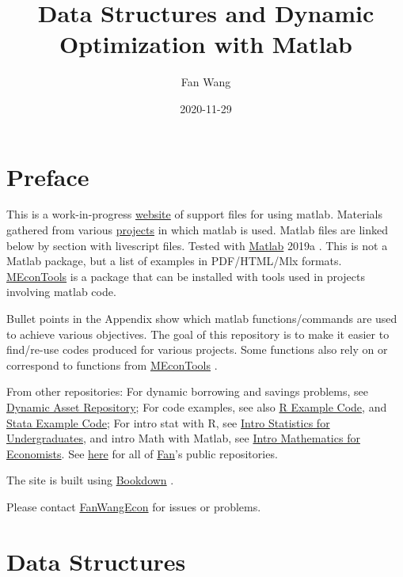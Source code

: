 \documentclass[
]{book}
\title{Data Structures and Dynamic Optimization with Matlab}
\author{Fan Wang}
\date{2020-11-29}
\begin{document}
\maketitle

{
\hypersetup{linkcolor=}
\setcounter{tocdepth}{2}
\tableofcontents
}
\hypertarget{preface}{%
\chapter*{Preface}\label{preface}}

This is a work-in-progress \href{https://fanwangecon.github.io/M4Econ/}{website} of support files for using matlab. Materials gathered from various \href{https://fanwangecon.github.io/research}{projects} in which matlab is used. Matlab files are linked below by section with livescript files. Tested with \href{https://www.mathworks.com/products/matlab.html}{Matlab} 2019a \citep{matlab}. This is not a Matlab package, but a list of examples in PDF/HTML/Mlx formats. \href{https://github.com/FanWangEcon/MEconTools}{MEconTools} is a package that can be installed with tools used in projects involving matlab code.

Bullet points in the Appendix show which matlab functions/commands are used to achieve various objectives. The goal of this repository is to make it easier to find/re-use codes produced for various projects. Some functions also rely on or correspond to functions from \href{https://github.com/FanWangEcon/MEconTools}{MEconTools} \citep{M-MEconTools}.

From other repositories: For dynamic borrowing and savings problems, see \href{https://fanwangecon.github.io/CodeDynaAsset/}{Dynamic Asset Repository}; For code examples, see also \href{https://fanwangecon.github.io/R4Econ/}{R Example Code}, and \href{https://fanwangecon.github.io/Stata4Econ/}{Stata Example Code}; For intro stat with R, see \href{https://fanwangecon.github.io/Stat4Econ/}{Intro Statistics for Undergraduates}, and intro Math with Matlab, see \href{https://fanwangecon.github.io/Math4Econ/}{Intro Mathematics for Economists}. See \href{https://github.com/FanWangEcon}{here} for all of \href{https://fanwangecon.github.io/}{Fan}'s public repositories.

The site is built using \href{https://bookdown.org/}{Bookdown} \citep{R-bookdown}.

Please contact \href{https://fanwangecon.github.io/}{FanWangEcon} for issues or problems.

\hypertarget{data-structures}{%
\chapter{Data Structures}\label{data-structures}}
\end{document}
